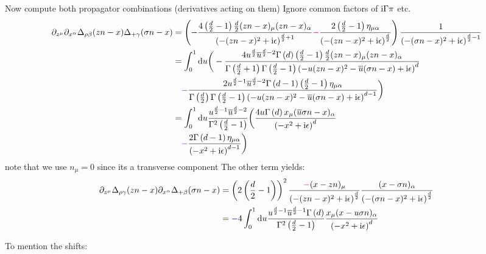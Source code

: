 Now compute both propagator combinations (derivatives acting on them)
Ignore common factors of $\text{i} \Gamma \pi$ etc.
\begin{align}
\partial_{z^\mu} \partial_{x^\alpha} \Delta_{\rho \beta}(zn-x) \Delta_{+ \gamma}(\sigma n -x)
&=
\left(-\frac{4 \left(\frac{d}{2}-1\right)\frac{d}{2}(zn-x)_\mu (zn-x)_\alpha}{\left(-(zn-x)^2 +\text{i} \epsilon\right)^{\frac{d}{2}+1}} {\color{red}-} \frac{2\left( \frac{d}{2}-1\right) \eta_{\mu \alpha} }{\left(-(zn-x)^2 +\text{i} \epsilon\right)^{\frac{d}{2}}}\right)\frac{1}{\left(-(\sigma n-x)^2 + \text{i} \epsilon\right)^{\frac{d}{2}-1}}
\\
&=
\int_{0}^{1} \text{d} u 	\bigg(-\frac{4 u^{\frac{d}{2}} \overline u^{\frac{d}{2}-2} \Gamma\left( d \right) \left(\frac{d}{2}-1\right)\frac{d}{2}(zn-x)_\mu (zn-x)_\alpha}{\Gamma\left( \frac{d}{2} +1 \right) \Gamma\left( \frac{d}{2} -1 \right)\left(-u(zn-x)^2 - \overline u(\sigma n -x) +\text{i} \epsilon\right)^{d}} 
\\&~~~
{\color{blue}-} \frac{2u^{\frac{d}{2}-1} \overline u ^{\frac{d}{2}-2}\Gamma\left( d-1 \right)\left( \frac{d}{2}-1\right) \eta_{\mu \alpha} }{\Gamma\left( \frac{d}{2}\right)\Gamma\left( \frac{d}{2} -1 \right)\left(-u(zn-x)^2 - \overline u(\sigma n -x) +\text{i} \epsilon\right)^{d-1}}\bigg)
\\
&=
\int_{0}^{1} \text{d} u \frac{ u^{\frac{d}{2}-1} \overline u^{\frac{d}{2}-2} }{\Gamma^2\left( \frac{d}{2} -1 \right)}	\bigg(\frac{4 u \Gamma\left( d \right) x_\mu (\overline u\sigma n-x)_\alpha}{\left(-x^2 +\text{i} \epsilon\right)^{d}} 
\\&~~~
{\color{blue}-} \frac{2\Gamma\left( d-1 \right) \eta_{\mu \alpha} }{\left(-x^2+\text{i} \epsilon\right)^{d-1}}\bigg)
\end{align}
note that we use $n_\mu=0$ since its a transverse component
The other term yields:
\begin{align}
\partial_{z^\mu}  \Delta_{\rho \gamma}(zn-x) \partial_{x^\alpha}\Delta_{+ \beta}(\sigma n -x)
&=
\left(2 \left(\frac{d}{2}-1\right)\right)^2 \frac{{\color{red}-}(x-zn)_\mu}{\left(-(zn-x)^2+ \text{i} \epsilon\right)^{\frac{d}{2}}} \frac{(x-\sigma n)_\alpha}{\left(-(\sigma n-x)^2+ \text{i} \epsilon\right)^{\frac{d}{2}}}
\\
&=
{\color{blue}-}4\int_{0}^{1} \text{d} u \frac{u^{\frac{d}{2}-1} \overline u^{\frac{d}{2}-1}\Gamma\left( d \right)}{\Gamma^2\left( \frac{d}{2}-1 \right)}\frac{x_\mu(x -  u\sigma n)_\alpha}{\left(-x^2 + \text{i} \epsilon\right)^{d}}
\end{align}

To mention the shifts:

